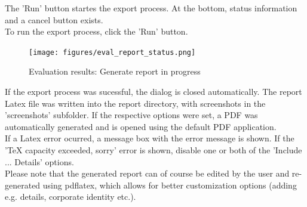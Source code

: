 The 'Run' button startes the export process. At the bottom, status information and a cancel button exists. \\

To run the export process, click the 'Run' button.

\begin{figure}[H]
    \texttt{[image: figures/eval\_report\_status.png]}
  \caption{Evaluation results: Generate report in progress}
\end{figure}

If the export process was sucessful, the dialog is closed automatically. The report Latex file was written into the report directory, with screenshots in the 'screenshots' subfolder. If the respective options were set, a PDF was automatically generated and is opened using the default PDF application. \\

If a Latex error ocurred, a message box with the error message is shown. If the 'TeX capacity exceeded, sorry' error is shown, disable one or both of the 'Include ... Details' options.\\

Please note that the generated report can of course be edited by the user and re-generated using pdflatex, which allows for better customization options (adding e.g. details, corporate identity etc.).


